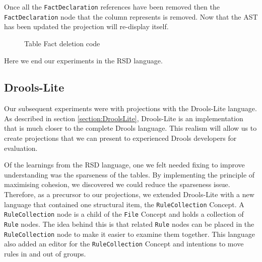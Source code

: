 Once all the \texttt{FactDeclaration} references have been removed then the \texttt{FactDeclaration} node that the column represents is removed.
Now that the AST has been updated the projection will re-display itself.

\begin{figure}
    \centering
    \caption{Table Fact deletion code}
    \label{fig:tableFactDeletion}
\end{figure}

Here we end our experiments in the RSD language.

\newpage

\subsection{Drools-Lite}

Our subsequent experiments were with projections with the Drools-Lite language.
As described in section \ref{section:DroolsLite}, Drools-Lite is an implementation that is much closer to the complete Drools language.
This realism will allow us to create projections that we can present to experienced Drools developers for evaluation.

Of the learnings from the RSD language, one we felt needed fixing to improve understanding was the sparseness of the tables.
By implementing the principle of maximising cohesion, we discovered we could reduce the sparseness issue.
Therefore, as a precursor to our projections, we extended Drools-Lite with a new language that contained one structural item, the \texttt{RuleCollection} Concept.
A \texttt{RuleCollection} node is a child of the \texttt{File} Concept and holds a collection of \texttt{Rule} nodes.
The idea behind this is that related \texttt{Rule} nodes can be placed in the \texttt{RuleCollection} node to make it easier to examine them together.
This language also added an editor for the \texttt{RuleCollection} Concept and intentions to move rules in and out of groups.

